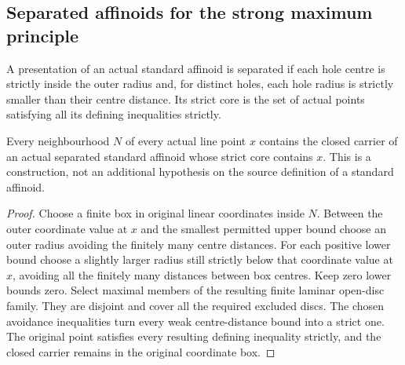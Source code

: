 \subsection{Separated affinoids for the strong maximum principle}\label{subsec:fc-line-separated-neighbourhoods}

\begin{definition}\label{def:fc-separated-affinoid-core}
\leanok
{}
A presentation of an actual standard affinoid is separated if each hole
centre is strictly inside the outer radius and, for distinct holes,
each hole radius is strictly smaller than their centre distance.
Its strict core is the set of actual points satisfying all its defining
inequalities strictly.
\end{definition}

\begin{theorem}\label{thm:fc-separated-affinoid-basis}
\leanok
{}
Every neighbourhood $N$ of every actual line point $x$ contains the closed
carrier of an actual separated standard affinoid whose strict core contains
$x$. This is a construction, not an additional hypothesis on the source
definition of a standard affinoid.
\end{theorem}

\begin{proof}
Choose a finite box in original linear coordinates inside $N$. Between the
outer coordinate value at $x$ and the smallest permitted upper bound choose
an outer radius avoiding the finitely many centre distances. For each
positive lower bound choose a slightly larger radius still strictly below
that coordinate value at $x$, avoiding all the finitely many distances
between box centres. Keep zero lower bounds zero. Select maximal members
of the resulting finite laminar open-disc family. They are disjoint and
cover all the required excluded discs. The chosen avoidance inequalities
turn every weak centre-distance bound into a strict one. The original
point satisfies every resulting defining inequality strictly, and the
closed carrier remains in the original coordinate box.
\end{proof}

